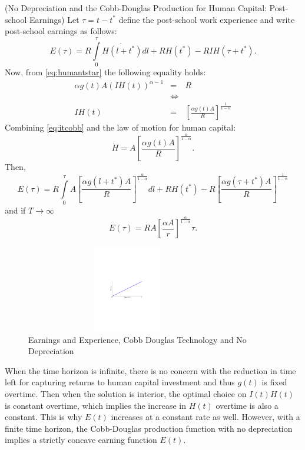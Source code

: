 \begin{case} (No Depreciation and the Cobb-Douglas Production for Human Capital: Post-school Earnings)
Let $\tau = t - t^*$ define the post-school work experience and write post-school earnings as follows:
\begin{equation}
E(\tau) = R \int \limits _{0} ^{\tau} \dot{H( l + t^*)}d l + R H(t^*) - RIH(\tau + t^*).
\end{equation}
Now, from \eqref{eq:humantstar} the following equality holds:
\begin{eqnarray}
\alpha g(t) A \left( IH(t) \right)^{\alpha - 1} &=& R \nonumber \\
&\Leftrightarrow& \nonumber \\
IH(t) &=& \left[ \frac{\alpha g(t) A}{R} \right]^{\frac{1}{1-\alpha}} \label{eq:itcobb}
\end{eqnarray}
Combining \eqref{eq:itcobb} and the law of motion for human capital:
\begin{equation}
\dot{H} = A \left[ \frac{\alpha g(t) A}{R} \right]^{\frac{\alpha}{1-\alpha}} \label{eq:hdot}.
\end{equation}
Then,
\begin{equation}
E(\tau) = R \int \limits _{0} ^{\tau} A \left[ \frac{\alpha g(l + t^*) A}{R} \right]^{\frac{\alpha}{1-\alpha}} dl + RH(t^*) - R \left[ \frac{\alpha g \left( \tau + t^* \right) A}{R} \right]^{\frac{1}{1-\alpha}} \label{equation:postearnings}
\end{equation}
and if $T \rightarrow \infty$
\begin{equation}
E(\tau) = RA \left[ \frac{\alpha A}{r} \right]^{\frac{\alpha}{1-\alpha}} \tau.
\end{equation}

\begin{center}
\begin{figure}[H]
\caption{Earnings and Experience, Cobb Douglas Technology and No Depreciation}
\centering
\includegraphics[width=3.5in, height=1.5in]{Figures/fig-earnings-experience.pdf}
\end{figure}
\end{center}

\indent When the time horizon is infinite, there is no concern with the reduction in time left for capturing returns to human capital investment and thus $g(t)$ is fixed overtime. Then when the solution is interior, the optimal choice on $I(t)H(t)$ is constant overtime, which implies the increase in $H(t)$ overtime is also a constant. This is why $E(t)$ increases at a constant rate as well. However, with a finite time horizon, the Cobb-Douglas production function with no depreciation implies a strictly concave earning function $E(t)$.
\end{case}

